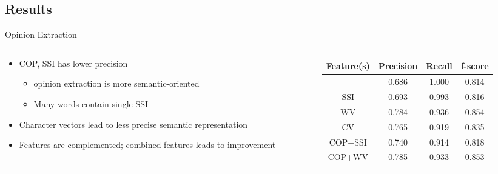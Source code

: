 \documentclass[compress]{beamer}
\begin{document}
    \subsection{Results}
        \begin{frame}{Opinion Extraction}
            \begin{columns}
                \begin{column}[T]{.5\textwidth}
                    \begin{itemize}
                        \item<1-> COP, SSI has lower precision
                            \begin{itemize}
                                \item opinion extraction  is more semantic-oriented
                                \item Many words contain single SSI
                            \end{itemize}
                        \item<2-> Character vectors lead to less precise semantic representation
                        \item<3-> Features are complemented; combined features leads to improvement
                    \end{itemize}
                \end{column}
                \begin{column}[T]{.6\textwidth}
                    \begin{table}
                    \small
                    \centering
                    \tabcolsep=0.1cm
                    \begin{tabular}{cccc}
                    \hline
                    Feature(s) & Precision & Recall & f-score \\ \hline
                    \only<1>{
                        COP        & \cellcolor{green}0.686     & 1.000  & 0.814   \\ \hline
                        SSI        & \cellcolor{green}0.693     & 0.993  & 0.816   \\ \hline
                        WV         & 0.784     & 0.936  & 0.854   \\ \hline
                        CV         & 0.765     & 0.919  & 0.835   \\ \hline
                        COP+SSI    & 0.740     & 0.914  & 0.818   \\ \hline
                        COP+WV     & 0.785     & 0.933  & 0.853   \\ \hline
}
\end{tabular}
\end{table}
\end{column}
\end{columns}
\end{frame}
\end{document}

